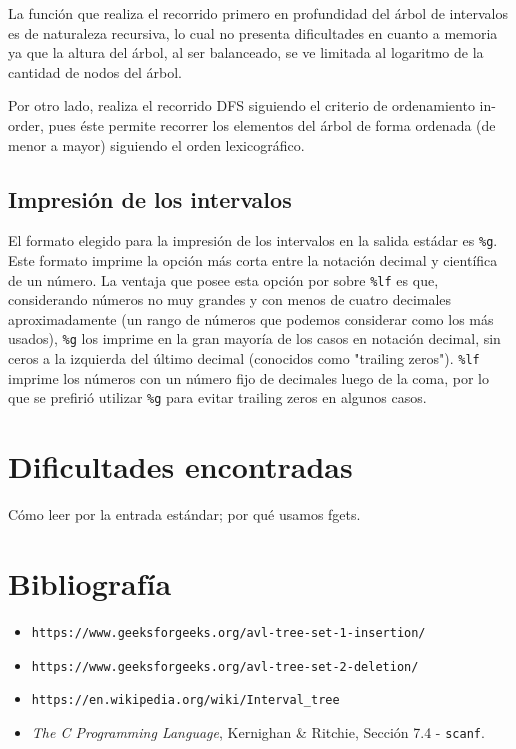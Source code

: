 \documentclass[11pt]{article}
\begin{document}
 La función que realiza el recorrido primero en profundidad del árbol de intervalos es de naturaleza recursiva, lo cual no presenta dificultades en cuanto a memoria ya que la altura del árbol, al ser balanceado, se ve limitada al logaritmo de la cantidad de nodos del árbol. \par

 Por otro lado, realiza el recorrido DFS siguiendo el criterio de ordenamiento in-order, pues éste permite recorrer los elementos del árbol de forma ordenada (de menor a mayor) siguiendo el orden lexicográfico. \par
 
 \subsection{Impresión de los intervalos}
 
 El formato elegido para la impresión de los intervalos en la salida estádar es \verb|%g|. Este formato imprime la opción más corta entre la notación decimal y científica de un número.  La ventaja que posee esta opción por sobre \verb|%lf| es que, considerando números no muy grandes y con menos de cuatro decimales aproximadamente (un rango de números que podemos considerar como los más usados), \verb|%g| los imprime en la gran mayoría de los casos en notación decimal, sin ceros a la izquierda del último decimal (conocidos como "trailing zeros"). \verb|%lf| imprime los números con un número fijo de decimales luego de la coma, por lo que se prefirió utilizar \verb|%g| para evitar trailing zeros en algunos casos.
 
 \section{Dificultades encontradas}
 
 Cómo leer por la entrada estándar; por qué usamos fgets.
 
 
 
 \section{Bibliografía}
 \begin{itemize}
     \item \verb|https://www.geeksforgeeks.org/avl-tree-set-1-insertion/|
     \item \verb|https://www.geeksforgeeks.org/avl-tree-set-2-deletion/|
     \item \verb|https://en.wikipedia.org/wiki/Interval_tree|
     \item \textit{The C Programming Language}, Kernighan \& Ritchie, Sección 7.4 - \verb|scanf|.
 \end{itemize}
 
\end{document}
